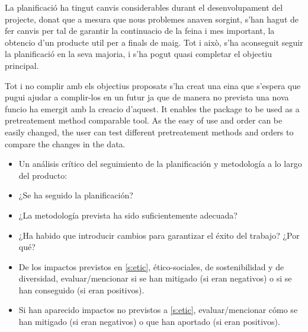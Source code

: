 \documentclass[ENG, BIB]{TFUOC}%
\begin{document}
La planificació ha tingut canvis considerables durant el desenvolupament del projecte, donat que a mesura que nous problemes anaven sorgint, s'han hagut de fer canvis per tal de garantir la continuacio de la feina i mes important, la obtencio d'un producte util per a finals de maig. Tot i això, s'ha aconseguit seguir la planificació en la seva majoria, i s'ha pogut quasi completar el objectiu principal.

Tot i no complir amb els objectius proposats s'ha creat una eina que s'espera que pugui ajudar a complir-los en un futur ja que de manera no prevista una nova funcio ha emergit amb la creacio d'aquest. It enables the package to be used as a pretreatement method comparable tool. As the easy of use and order can be easily changed, the user can test different pretreatement methods and orders to compare the changes in the data.

\begin{itemize}
    \item Un análisis crítico del seguimiento de la planificación y metodología a lo largo del producto:
    \item ¿Se ha seguido la planificación?
    \item ¿La metodología prevista ha sido suficientemente adecuada?
    \item ¿Ha habido que introducir cambios para garantizar el éxito del trabajo? ¿Por qué?
    \item De los impactos previstos en \ref{s:etic}, ético-sociales, de sostenibilidad y de diversidad, evaluar/mencionar si se han mitigado (si eran negativos) o si se han conseguido (si eran positivos).
    \item Si han aparecido impactos no previstos a \ref{s:etic}, evaluar/mencionar cómo se han mitigado (si eran negativos) o que han aportado (si eran positivos).
\end{itemize}




\printglossary[type=acronym, style=altlist, title=Glossary, toctitle=Glossary]



\printbibliography[heading=bibintoc]


\newpage
\appendix
\end{document}
